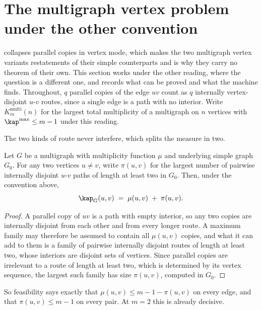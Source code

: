 
\section{The multigraph vertex problem under the other convention}\label{sec:multi-vertex-standard}

 collapses parallel copies in vertex mode, which makes the two multigraph vertex variants restatements of their simple counterparts and is why they carry no theorem of their own. This section works under the other reading, where the question is a different one, and records what can be proved and what the machine finds. Throughout, $q$ parallel copies of the edge $uv$ count as $q$ internally vertex-disjoint $u$-$v$ routes, since a single edge is a path with no interior. Write $K_m^{\mathrm{multi}}(n)$ for the largest total multiplicity of a multigraph on $n$ vertices with $\kap^{\max} \le m-1$ under this reading.

The two kinds of route never interfere, which splits the measure in two.

\begin{lemma}\label{lem:multi-vertex-split}
Let $G$ be a multigraph with multiplicity function $\mu$ and underlying simple graph $G_0$. For any two vertices $u \ne v$, write $\pi(u,v)$ for the largest number of pairwise internally disjoint $u$-$v$ paths of length at least two in $G_0$. Then, under the convention above,
\[
    \kap_G(u,v) \;=\; \mu(u,v) \;+\; \pi(u,v).
\]
\end{lemma}

\begin{proof}
A parallel copy of $uv$ is a path with empty interior, so any two copies are internally disjoint from each other and from every longer route. A maximum family may therefore be assumed to contain all $\mu(u,v)$ copies, and what it can add to them is a family of pairwise internally disjoint routes of length at least two, whose interiors are disjoint sets of vertices. Since parallel copies are irrelevant to a route of length at least two, which is determined by its vertex sequence, the largest such family has size $\pi(u,v)$, computed in $G_0$.
\end{proof}

So feasibility says exactly that $\mu(u,v) \le m-1-\pi(u,v)$ on every edge, and that $\pi(u,v) \le m-1$ on every pair. At $m = 2$ this is already decisive.

